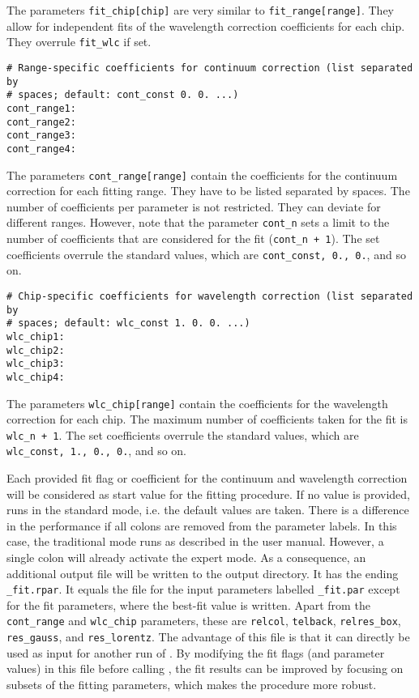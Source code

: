 The parameters {\tt fit\_chip[chip]} are very similar to {\tt fit\_range[range]}.
They allow for independent fits of the wavelength correction coefficients for
each chip. They overrule {\tt fit\_wlc} if set.

\begin{verbatim}
# Range-specific coefficients for continuum correction (list separated by
# spaces; default: cont_const 0. 0. ...)
cont_range1:
cont_range2:
cont_range3:
cont_range4:
\end{verbatim}

The parameters {\tt cont\_range[range]} contain the coefficients for the
continuum correction for each fitting range. They have to be listed separated
by spaces.
The number of coefficients per parameter is not restricted. They can deviate
for different ranges. However, note that the parameter {\tt cont\_n} sets a limit to
the number of coefficients that are considered for the fit ({\tt cont\_n + 1}).
The set coefficients overrule the standard values, which are
{\tt cont\_const, 0., 0.}, and so on.

\begin{verbatim}
# Chip-specific coefficients for wavelength correction (list separated by
# spaces; default: wlc_const 1. 0. 0. ...)
wlc_chip1:
wlc_chip2:
wlc_chip3:
wlc_chip4:
\end{verbatim}

The parameters {\tt wlc\_chip[range]} contain the coefficients for the
wavelength correction for each chip. The maximum number of coefficients taken
for the fit is {\tt wlc\_n + 1}.
The set coefficients overrule the standard values, which are
{\tt wlc\_const, 1., 0., 0.}, and so on.

Each provided fit flag or coefficient for the continuum and wavelength
correction will be considered as start value for the fitting procedure.
If no value is provided, \mf{} runs in the standard mode, i.e. the default
values are taken. There is a difference in the performance if all colons are
removed from the parameter labels. In this case, the traditional \mf{} mode
runs as described in the user manual. However, a single colon will already
activate the expert mode. As a consequence, an additional output file will
be written to the output directory. It has the ending {\tt \_fit.rpar}.
It equals the file for the \mf{} input parameters labelled {\tt \_fit.par}
except for the fit parameters, where the best-fit value is written.  Apart from
the {\tt cont\_range} and {\tt wlc\_chip} parameters, these are {\tt relcol},
{\tt telback}, {\tt relres\_box}, {\tt res\_gauss}, and {\tt res\_lorentz}.
The advantage of this file is that it can directly be used as input for another
run of \mf. By modifying the fit flags (and parameter values) in this file
before calling \mf, the fit results can be improved by focusing on subsets of
the fitting parameters, which makes the procedure more robust.

